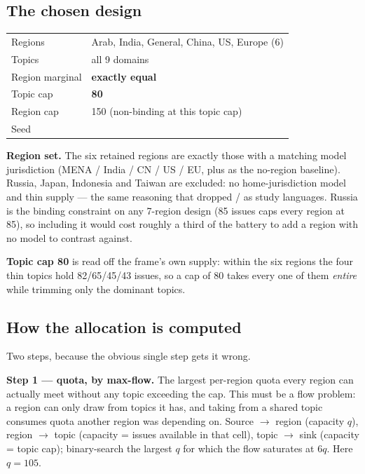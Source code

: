 \documentclass[11pt]{article}
\DeclareRobustCommand{\code}[1]{\texttt{\seqsplit{#1}}}
\begin{document}
\subsection{The chosen design}

\begin{center}
\small
\begin{tabular}{@{}ll@{}}
\toprule
Regions & Arab, India, General, China, US, Europe (6) \\
Topics & all 9 domains \\
Region marginal & \textbf{exactly equal} \\
Topic cap & \textbf{80} \\
Region cap & 150 (non-binding at this topic cap) \\
Seed & \code{20260728} \\
\bottomrule
\end{tabular}
\end{center}

\noindent \textbf{Region set.} The six retained regions are exactly those with a
matching model jurisdiction (MENA / India / CN / US / EU, plus \code{General} as
the no-region baseline). Russia, Japan, Indonesia and Taiwan are excluded: no
home-jurisdiction model and thin supply --- the same reasoning that dropped
\code{ja}/\code{id} as study languages. Russia is the binding constraint on any
7-region design (85 issues caps every region at 85), so including it would cost
roughly a third of the battery to add a region with no model to contrast against.

\noindent \textbf{Topic cap 80} is read off the frame's own supply: within the
six regions the four thin topics hold 82/65/45/43 issues, so a cap of 80 takes
every one of them \emph{entire} while trimming only the dominant topics.

\subsection{How the allocation is computed}

Two steps, because the obvious single step gets it wrong.

\textbf{Step 1 --- quota, by max-flow.} The largest per-region quota every region
can actually meet without any topic exceeding the cap. This must be a flow
problem: a region can only draw from topics it has, and taking from a shared
topic consumes quota another region was depending on. Source $\rightarrow$ region
(capacity $q$), region $\rightarrow$ topic (capacity = issues available in that
cell), topic $\rightarrow$ sink (capacity = topic cap); binary-search the largest
$q$ for which the flow saturates at $6q$. Here $q = 105$.
\end{document}
